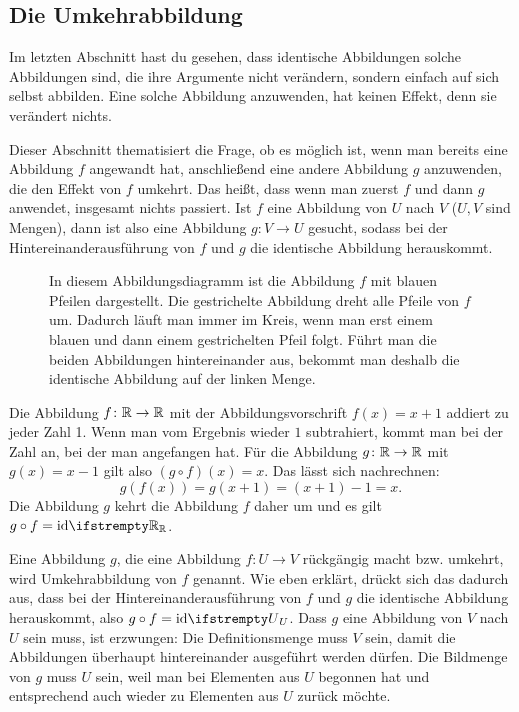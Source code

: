 \documentclass[../../main.tex]{subfiles}
\begin{document}
\subsection{Die Umkehrabbildung}
\label{sec:abbildungen_umkehrabbildung}

Im letzten Abschnitt hast du gesehen, dass identische Abbildungen solche Abbildungen sind, die ihre Argumente nicht verändern, sondern einfach auf sich selbst abbilden. Eine solche Abbildung anzuwenden, hat keinen Effekt, denn sie verändert nichts.

Dieser Abschnitt thematisiert die Frage, ob es möglich ist, wenn man bereits eine Abbildung $f$ angewandt hat, anschließend eine andere Abbildung $g$ anzuwenden, die den Effekt von $f$ umkehrt. Das heißt, dass wenn man zuerst $f$ und dann $g$ anwendet, insgesamt nichts passiert. Ist $f$ eine Abbildung von $U$ nach $V$ ($U,V$ sind Mengen), dann ist also eine Abbildung $g\colon V\rightarrow U$ gesucht, sodass bei der Hintereinanderausführung von $f$ und $g$ die identische Abbildung herauskommt.

\begin{figure}[ht]
    \centering
    
    \caption{In diesem Abbildungsdiagramm ist die Abbildung $f$ mit blauen Pfeilen dargestellt. Die gestrichelte Abbildung dreht alle Pfeile von $f$ um. Dadurch läuft man immer im Kreis, wenn man erst einem blauen und dann einem gestrichelten Pfeil folgt. Führt man die beiden Abbildungen hintereinander aus, bekommt man deshalb die identische Abbildung auf der linken Menge.}
\end{figure}

\begin{example}{}
    Die Abbildung $f\colon\mathbb{R}\rightarrow\mathbb{R}$ mit der Abbildungsvorschrift $f(x)=x+1$ addiert zu jeder Zahl 1. Wenn man vom Ergebnis wieder $1$ subtrahiert, kommt man bei der Zahl an, bei der man angefangen hat. Für die Abbildung $g\colon\mathbb{R}\rightarrow\mathbb{R}$ mit $g(x)=x-1$ gilt also $(g\circ f)(x)=x$. Das lässt sich nachrechnen:
    \[g(f(x))=g(x+1)=(x+1)-1=x.\]
    Die Abbildung $g$ kehrt die Abbildung $f$ daher um und es gilt $g\circ f=\ident[\Real]$.
\end{example}

Eine Abbildung $g$, die eine Abbildung $f\colon U\rightarrow V$ rückgängig macht bzw. umkehrt, wird Umkehrabbildung von $f$ genannt. Wie eben erklärt, drückt sich das dadurch aus, dass bei der Hintereinanderausführung von $f$ und $g$ die identische Abbildung herauskommt, also $g\circ f=\ident[U]$. Dass $g$ eine Abbildung von $V$ nach $U$ sein muss, ist erzwungen: Die Definitionsmenge muss $V$ sein, damit die Abbildungen überhaupt hintereinander ausgeführt werden dürfen. Die Bildmenge von $g$ muss $U$ sein, weil man bei Elementen aus $U$ begonnen hat und entsprechend auch wieder zu Elementen aus $U$ zurück möchte.
\end{document}
